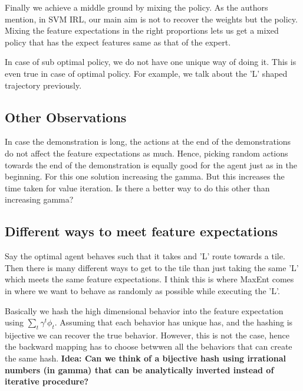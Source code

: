 \documentclass{article}[11pt]
\begin{document}
Finally we achieve a middle ground by mixing the policy. As the authors mention, in SVM IRL, our main aim is not to recover the weights but the policy. Mixing the feature expectations in the right proportions lets us get a mixed policy that has the expect features same as that of the expert. 

In case of sub optimal policy, we do not have one unique way of doing it. This is even true in case of optimal policy. For example, we talk about the 'L' shaped trajectory previously.

\subsection{Other Observations}
In case the demonstration is long, the actions at the end of the demonstrations do not affect the feature expectations as much. Hence, picking random actions towards the end of the demonstration is equally good for the agent just as in the beginning. For this one solution increasing the gamma. But this increases the time taken for value iteration. Is there a better way to do this other than increasing gamma? 

\subsection{Different ways to meet feature expectations}

Say the optimal agent behaves such that it takes and 'L' route towards a tile. Then there is many different ways to get to the tile than just taking the same 'L' which meets the same feature expectations. I think this is where MaxEnt comes in where we want to behave as randomly as possible while executing the 'L'.

Basically we hash the high dimensional behavior into the feature expectation using $\sum_t \gamma^t \phi_t$. Assuming that each behavior has unique has, and the hashing is bijective we can recover the true behavior. However, this is not the case, hence the backward mapping has to choose betwwen all the behaviors that can create the same hash. \textbf{Idea: Can we think of a bijective hash using irrational numbers (in gamma) that can be analytically inverted instead of iterative procedure?}
 
\end{document}
